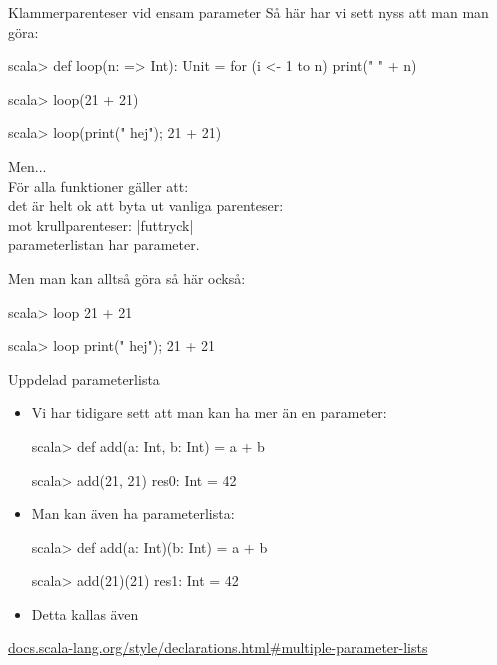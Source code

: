 \begin{Slide}{Klammerparenteser vid ensam parameter}
Så här har vi sett nyss att man man göra:
\begin{REPL}
scala> def loop(n: => Int): Unit = for (i <- 1 to n) print(" " + n)

scala> loop(21 + 21)

scala> loop({print(" hej"); 21 + 21})
\end{REPL}

Men...\\För alla funktioner  gäller att: \\ det är helt ok att byta ut vanliga parenteser: \hfill{} \\ mot krullparenteser: \hfill\code|f{uttryck}| \\  parameterlistan har  parameter.  

\vspace{0.5em}Men man kan alltså göra så här också:
\begin{REPLnonum}
scala> loop{ 21 + 21 }

scala> loop{ print(" hej"); 21 + 21 }
\end{REPLnonum}


\end{Slide} 

\begin{Slide}{Uppdelad parameterlista}
\begin{itemize}
\item Vi har tidigare sett att man kan ha mer än en parameter:
\begin{REPLnonum}
scala> def add(a: Int, b: Int) = a + b

scala> add(21, 21)
res0: Int = 42
\end{REPLnonum}

\item Man kan även ha  parameterlista:
\begin{REPLnonum}

scala> def add(a: Int)(b: Int) = a + b

scala> add(21)(21)
res1: Int = 42
\end{REPLnonum}
\item Detta kallas även  
\end{itemize}
\href{http://docs.scala-lang.org/style/declarations.html#multiple-parameter-lists}{\SlideFontTiny docs.scala-lang.org/style/declarations.html\#multiple-parameter-lists}
\end{Slide} 


